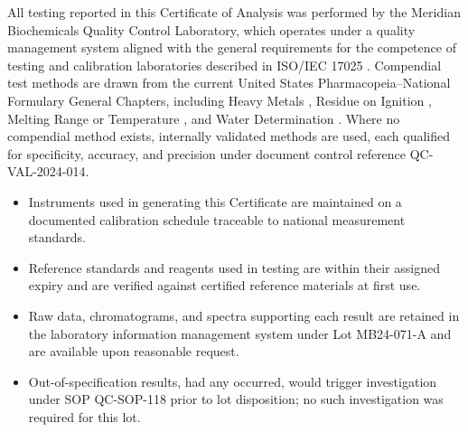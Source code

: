 
All testing reported in this Certificate of Analysis was performed by the Meridian Biochemicals Quality Control Laboratory, which operates under a quality management system aligned with the general requirements for the competence of testing and calibration laboratories described in ISO/IEC 17025 \cite{iso17025}. Compendial test methods are drawn from the current United States Pharmacopeia--National Formulary General Chapters, including Heavy Metals \cite{usp231}, Residue on Ignition \cite{usp281}, Melting Range or Temperature \cite{usp741}, and Water Determination \cite{usp921}. Where no compendial method exists, internally validated methods are used, each qualified for specificity, accuracy, and precision under document control reference QC-VAL-2024-014.

\begin{itemize}[leftmargin=1.4em, label=\textcolor{meridianTeal}{\faCheck}]
\item Instruments used in generating this Certificate are maintained on a documented calibration schedule traceable to national measurement standards.
\item Reference standards and reagents used in testing are within their assigned expiry and are verified against certified reference materials at first use.
\item Raw data, chromatograms, and spectra supporting each result are retained in the laboratory information management system under Lot MB24-071-A and are available upon reasonable request.
\item Out-of-specification results, had any occurred, would trigger investigation under SOP QC-SOP-118 prior to lot disposition; no such investigation was required for this lot.
\end{itemize}



